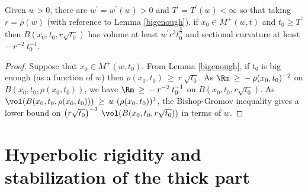 \begin{lemma}
  \label{lem:kl-thick-thin-decomposition-existence-thick-thin-geometry}
 \label{applies}
Given $w > 0$, there are
$w^\prime = w^\prime(w) > 0$ and $T^\prime = T^\prime(w) < \infty$ so that
taking $r = \overline{\rho}(w)$
(with reference to Lemma \ref{bigenough}),
if $x_0 \in M^+(w,t)$ and $t_0 \ge T^\prime$ then
$B(x_0, t_0, r\sqrt{t_0})$ has volume at least $w^\prime r^3 t_0^{\frac32}$ and
sectional curvature at least $- \: r^{-2} \: t_0^{-1}$.
\end{lemma}
\begin{proof}
Suppose that $x_0 \in M^+(w, t_0)$. From Lemma \ref{bigenough},
if $t_0$ is big enough (as a function of $w$) then $\rho(x_0, t_0)
\: \ge \: r \: \sqrt{t_0}$.  As $\Rm \: \ge \:
- \: \rho(x_0, t_0)^{-2}$ on $B(x_0, t_0, \rho(x_0, t_0))$, we have
$\Rm \: \ge \:
- \: r^{-2} \: t_0^{-1}$ on $B(x_0, t_0, r \sqrt{t_0})$.
As $\vol(B(x_0, t_0, \rho(x_0, t_0))) \: \ge \: w \:
(\rho(x_0, t_0))^3$, the Bishop-Gromov inequality gives a
lower bound on $\left( r \sqrt{t_0} \right)^{-3} \:
\vol(B(x_0, t_0, r \sqrt{t_0}))$ in terms of $w$.
\end{proof}

\section{Hyperbolic rigidity and stabilization of the thick part}
\label{hyprig}

